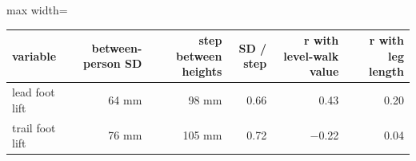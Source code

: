 \begin{adjustbox}{max width=\textwidth}
{\footnotesize
\begin{tabular}{lrrrrr}
\toprule
\textbf{variable} & \textbf{between-person SD} & \textbf{step between heights} & \textbf{SD / step} & \textbf{r with level-walk value} & \textbf{r with leg length} \\
\midrule
lead foot lift & 64 mm & 98 mm & 0.66 & 0.43 & 0.20 \\
trail foot lift & 76 mm & 105 mm & 0.72 & $-$0.22 & 0.04 \\
\bottomrule
\end{tabular}
}
\end{adjustbox}

